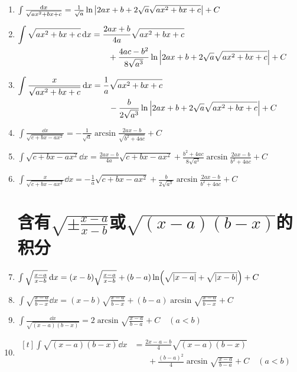 \begin{enumerate}
\item \(\int \frac{\dd{x}}{\sqrt{ax^2+bx+c}} = \frac{1}{\sqrt{a}} \ln\abs{2ax+b+2\sqrt{a}\sqrt{ax^2+bx+c}} + C\)
\item \(\begin{aligned}[t]
\int \sqrt{ax^2+bx+c} \dd{x}
&= \frac{2ax+b}{4a} \sqrt{ax^2+bx+c} \\
&\hspace{20pt}+ \frac{4ac-b^2}{8\sqrt{a^3}} \ln\abs{2ax+b+2\sqrt{a}\sqrt{ax^2+bx+c}} + C
\end{aligned}\)
\item \(\begin{aligned}[t]
\int \frac{x}{\sqrt{ax^2+bx+c}} \dd{x}
&= \frac{1}{a}\sqrt{ax^2+bx+c} \\
&\hspace{20pt}- \frac{b}{2\sqrt{a^3}} \ln\abs{2ax+b+2\sqrt{a}\sqrt{ax^2+bx+c}} + C
\end{aligned}\)
\item \(\int \frac{\dd{x}}{\sqrt{c+bx-ax^2}} = -\frac{1}{\sqrt{a}} \arcsin\frac{2ax-b}{\sqrt{b^2+4ac}} + C\)
\item \(\int \sqrt{c+bx-ax^2} \dd{x} = \frac{2ax-b}{4a} \sqrt{c+bx-ax^2} + \frac{b^2+4ac}{8\sqrt{a^3}} \arcsin\frac{2ax-b}{b^2+4ac} + C\)
\item \(\int \frac{x}{\sqrt{c+bx-ax^2}} \dd{x} = -\frac{1}{a} \sqrt{c+bx-ax^2} + \frac{b}{2\sqrt{a^3}} \arcsin\frac{2ax-b}{b^2+4ac} + C\)

\section*{含有\(\sqrt{\pm\frac{x-a}{x-b}}\)或\(\sqrt{(x-a)(b-x)}\)的积分}
\item \(\int \sqrt{\frac{x-a}{x-b}} \dd{x} = (x-b) \sqrt{\frac{x-a}{x-b}} + (b-a) \ln(\sqrt{\abs{x-a}} + \sqrt{\abs{x-b}}) + C\)
\item \(\int \sqrt{\frac{x-a}{b-x}} \dd{x} = (x-b) \sqrt{\frac{x-a}{b-x}} + (b-a) \arcsin\sqrt{\frac{x-a}{b-x}} + C\)
\item \(\int \frac{\dd{x}}{\sqrt{(x-a)(b-x)}} = 2\arcsin\sqrt{\frac{x-a}{b-a}} + C \quad(a<b)\)
\item \(\begin{aligned}[t]
\int \sqrt{(x-a)(b-x)} \dd{x}
&= \frac{2x-a-b}{4} \sqrt{(x-a)(b-x)} \\
&\hspace{20pt}+ \frac{(b-a)^2}{4} \arcsin\sqrt{\frac{x-a}{b-a}} + C \quad(a<b)
\end{aligned}\)


\end{enumerate}
